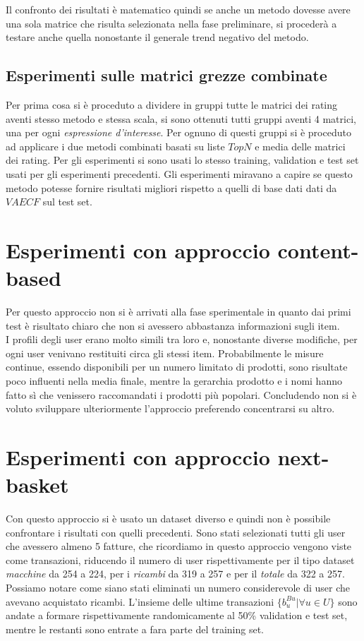 Il confronto dei risultati è matematico quindi se anche un metodo dovesse avere una sola matrice che risulta selezionata nella fase preliminare, si procederà a testare anche quella nonostante il generale trend negativo del metodo. 

\subsection{Esperimenti sulle matrici grezze combinate}
Per prima cosa si è proceduto a dividere in gruppi tutte le matrici dei rating aventi stesso metodo e stessa scala, si sono ottenuti tutti gruppi aventi 4 matrici, una per ogni \textit{espressione d'interesse}. Per ognuno di questi gruppi si è proceduto ad applicare i due metodi combinati basati su liste $TopN$ e media delle matrici dei rating. Per gli esperimenti si sono usati lo stesso training, validation e test set usati per gli esperimenti precedenti. Gli esperimenti miravano a capire se questo metodo potesse fornire risultati migliori rispetto a quelli di base dati dati da $VAECF$ sul test set.

\section{Esperimenti con approccio content-based}
Per questo approccio non si è arrivati alla fase sperimentale in quanto dai primi test è risultato chiaro che non si avessero abbastanza informazioni sugli item.\\
I profili degli user erano molto simili tra loro e, nonostante diverse modifiche, per ogni user venivano restituiti circa gli stessi item. Probabilmente le misure continue, essendo disponibili per un numero limitato di prodotti, sono risultate poco influenti nella media finale, mentre la gerarchia prodotto e i nomi hanno fatto sì che venissero raccomandati i prodotti più popolari. Concludendo non si è voluto sviluppare ulteriormente l'approccio preferendo concentrarsi su altro.

\section{Esperimenti con approccio next-basket}
Con questo approccio si è usato un dataset diverso e quindi non è possibile confrontare i risultati con quelli precedenti. Sono stati selezionati tutti gli user che avessero almeno 5 fatture, che ricordiamo in questo approccio vengono viste come transazioni, riducendo il numero di user rispettivamente per il tipo dataset \textit{macchine} da 254 a 224, per i \textit{ricambi} da 319 a 257 e per il \textit{totale} da 322 a 257.\\
Possiamo notare come siano stati eliminati un numero considerevole di user che avevano acquistato ricambi. L'insieme delle ultime transazioni $\{b_{u}^{Bu}| \forall u \in U\}$ sono andate a formare rispettivamente randomicamente al 50\% validation e test set, mentre le restanti sono entrate a fara parte del training set. 

